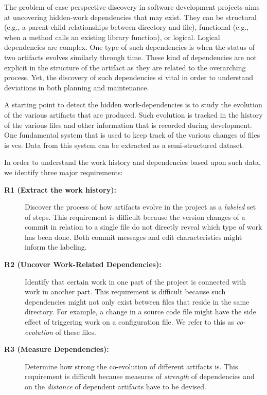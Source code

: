 The problem of case perspective discovery in software development projects aims at uncovering hidden-work dependencies that may exist. They can be structural (e.g., a parent-child relationships between directory and file), functional (e.g., when a method calls an existing library function), or logical. Logical dependencies are complex. One type of such dependencies is when the status of two artifacts evolves similarly through time. These kind of dependencies are not explicit in the structure of the artifact as they are related to the overarching process. Yet, the discovery of such dependencies si vital in order to understand deviations in both planning and maintenance.  

A starting point to detect the hidden work-dependencies is to study the evolution of the various artifacts that are produced. Such evolution is tracked in the history of the various files and other information that is recorded during development. One fundamental system that is used to keep track of the various changes of files is \gls{vcs}. Data from this system can be extracted as a semi-structured dataset. 

In order to understand the work history and dependencies based upon such data, we identify three major requirements:

\begin{description}
	\item [\bfseries R1 (Extract the work history):] Discover the process of how artifacts evolve in the project as a \emph{labeled} set of steps. This requirement is difficult because the version changes of a commit in relation to a single file do not directly reveal which type of work has been done. Both commit messages and edit characteristics might inform the labeling.	
	\item [\bfseries R2 (Uncover Work-Related Dependencies):] Identify that certain work in one part of the project is connected with work in another part. This requirement is difficult because such dependencies might not only exist between files that reside in the same directory. For example, a change in a source code file might have the side effect of triggering work on a configuration file. We refer to this as \emph{co-evolution} of these files.
	\item [\bfseries R3 (Measure Dependencies):] Determine how strong the co-evolution of different artifacts is. This requirement is difficult because measures of \emph{strength} of dependencies and on the \emph{distance} of   dependent artifacts have to be devised.
\end{description}










